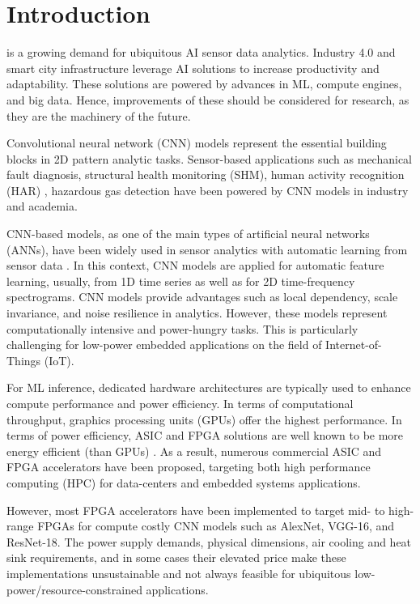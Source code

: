 
\section{Introduction}
\label{sec:introduction}
 is a growing demand for ubiquitous AI sensor data analytics. Industry 4.0 and smart city infrastructure leverage AI solutions to increase productivity and adaptability\cite{lom2016industry}. These solutions are powered by advances in ML, compute engines, and big data. Hence, improvements of these should be considered for research, as they are the machinery of the future.

Convolutional neural network (CNN) models represent the essential building blocks in 2D pattern analytic tasks. Sensor-based applications such as mechanical fault diagnosis\cite{li2019sensor,dong2018rolling}, structural health monitoring (SHM)\cite{nagayama2007structural}, human activity recognition (HAR) \cite{wang2019deep}, hazardous gas detection\cite{kim2017hazardous} have been powered by CNN models in industry and academia.

CNN-based models, as one of the main types of artificial neural networks (ANNs),
have been widely used in sensor analytics with automatic learning from sensor data \cite{ince2016real, janssens2016convolutional, abdeljaber2017real, guo2016hierarchical}. In this context, CNN models are applied for automatic feature learning, usually, from 1D time series as well as for 2D time-frequency spectrograms. CNN models provide advantages such as local dependency, scale invariance, and noise resilience in analytics. However, these models represent computationally intensive and power-hungry tasks. This is particularly challenging for low-power embedded applications on the field of Internet-of-Things (IoT).

For ML inference, dedicated hardware architectures are typically used to enhance compute performance and power efficiency. In terms of computational throughput, graphics processing units (GPUs) offer the highest performance. In terms of power efficiency, ASIC and FPGA solutions are well known to be more energy efficient (than GPUs) \cite{nurvitadhi2017can}. As a result, numerous commercial ASIC and FPGA accelerators have been proposed, targeting both high performance computing (HPC) for data-centers and embedded systems applications.

However, most FPGA accelerators have been implemented to target mid- to high-range FPGAs for compute costly CNN models such as AlexNet, VGG-16, and ResNet-18. The power supply demands, physical dimensions, air cooling and heat sink requirements, and in some cases their elevated price make these implementations unsustainable and not always feasible for ubiquitous low-power/resource-constrained applications.

